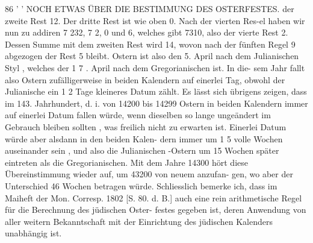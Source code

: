 \documentclass[12pt,a4paper]{article}
\begin{document}
\newpage

86      '  '  NOCH  ETWAS  ÜBER  DIE  BESTIMMUNG  DES  OSTERFESTES.
der  zweite  Rest  12.  Der  dritte  Rest  ist  wie  oben  0.  Nach  der  vierten  Res-el
haben  wir  nun  zu  addiren  7  232,  7  2,  0  und  6,  welches  gibt  7310,  also  der  vierte
Rest  2.  Dessen  Summe  mit  dem  zweiten  Rest  wird  14,  wovon  nach  der  fünften
Regel  9  abgezogen  der  Rest  5  bleibt.  Ostern  ist  also  den  5.  April  nach  dem
Julianischen  Styl ,  welches  der  1 7 .  April  nach  dem  Gregorianischen  ist.  In  die-
sem Jahr  fallt  also  Ostern  zufälligerweise  in  beiden  Kalendern  auf  einerlei  Tag,
obwohl  der  Julianische  ein  1 2  Tage  kleineres  Datum  zählt.
Es  lässt  sich  übrigens  zeigen,  dass  im  143.  Jahrhundert,  d.  i.  von  14200
bis  14299  Ostern  in  beiden  Kalendern  immer  auf  einerlei  Datum  fallen  würde,
wenn  dieselben  so  lange  ungeändert  im  Gebrauch  bleiben  sollten ,  was  freilich
nicht  zu  erwarten  ist.  Einerlei  Datum  würde  aber  alsdann  in  den  beiden  Kalen-
dern immer  um  1 5  volle  Wochen  auseinander  sein ,  und  also  die  Julianischen
-Ostern  um  15  Wochen  später  eintreten  als  die  Gregorianischen.  Mit  dem  Jahre
14300  hört  diese  Übereinstimmung  wieder  auf,  um  43200  von  neuem  anzufan-
gen, wo  aber  der  Unterschied  46  Wochen  betragen  würde.
Schliesslich  bemerke  ich,  dass  im  Maiheft  der  Mon.  Corresp.  1802  [S. 80.
d.  B.]  auch  eine  rein  arithmetische  Regel  für  die  Berechnung  des  jüdischen  Oster-
festes gegeben  ist,  deren  Anwendung  von  aller  weitern  Bekanntschaft  mit  der
Einrichtung  des  jüdischen  Kalenders  unabhängig  ist.

\newpage
\end{document}
